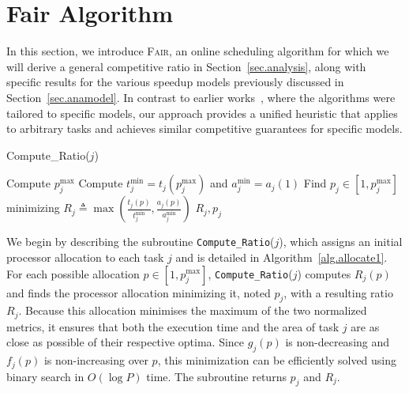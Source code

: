 \documentclass{article}
\newcommand\fair{\textsc{Fair}\xspace}
\newcommand\ratio{R\xspace}
\begin{document}
\section{Fair Algorithm}
\label{sec.alg}
In this section, we introduce \fair, an online scheduling algorithm for which we will derive a general competitive ratio in Section~\ref{sec.analysis}, along with specific results for the various speedup models previously discussed in Section~\ref{sec.anamodel}. In contrast to earlier works~\cite{ICPP22, TOPC24}, where the algorithms were tailored to specific models, our approach provides a unified heuristic that applies to arbitrary tasks and achieves similar competitive guarantees for specific models.

{
\begin{algorithm}[t]
    \footnotesize
	\caption{Compute\_Ratio($j$)}\label{alg.allocate1}
     
    \KwOut{Ratio $\ratio_j$ and processor allocation $p_j$} 
    Compute $p_j^{\max}$  
    Compute $t_j^{\min} = t_j(p_j^{\max})$ and $a_j^{\min} = a_j(1)$ 
    Find $p_j \in [1, p_j^{\max}]$ minimizing $\ratio_j \triangleq \max\left(\frac{t_j(p)}{t_j^{\min}}, \frac{a_j(p)}{a_j^{\min}}\right)$ 
    \Return $\ratio_j, p_j$
\end{algorithm}
}

We begin by describing the subroutine \texttt{Compute\_Ratio}($j$), which assigns an initial processor allocation to each task $j$ and is detailed in Algorithm~\ref{alg.allocate1}. For each possible allocation $p \in [1, p_j^{\max}]$, \texttt{Compute\_Ratio}($j$) computes  $\ratio_j(p)$ and finds the processor allocation minimizing it, noted $p_j$, with a resulting ratio $\ratio_j$. Because this allocation minimises the maximum of the two normalized metrics, it ensures that both the execution time and the area of task $j$ are as close as possible of their respective optima. Since $g_j(p)$ is non-decreasing and $f_j(p)$ is non-increasing over $p$, this minimization can be efficiently solved using binary search in $O(\log P)$ time. The subroutine returns $p_j$ and $\ratio_j$.
\end{document}
